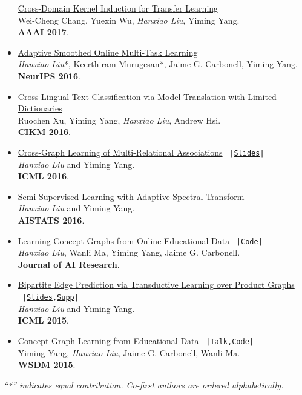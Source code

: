 \documentclass{article}
\begin{document}
\begin{itemize}
		\href{publications/chang-wu-aaai17.pdf}{Cross-Domain Kernel Induction for Transfer Learning} \\
		Wei-Cheng Chang, Yuexin Wu, \emph{Hanxiao Liu}, Yiming Yang. \\
		\textbf{AAAI 2017}.
	\item
		\href{publications/murugesan-liu-nips16.pdf}{Adaptive Smoothed Online Multi-Task Learning} \\
		\emph{Hanxiao Liu}*, Keerthiram Murugesan*, Jaime G. Carbonell, Yiming Yang. \\
		\textbf{NeurIPS 2016}.
	\item
		\href{publications/xu-cikm16.pdf}{Cross-Lingual Text Classification via Model Translation with Limited Dictionaries} \\
		Ruochen Xu, Yiming Yang, \emph{Hanxiao Liu}, Andrew Hsi. \\
		\textbf{CIKM 2016}. 
	\item 
		\href{publications/liu-icml16.pdf}{Cross-Graph Learning of Multi-Relational Associations}
		\
		\texttt{\scriptsize |\href{slides/icml2016-liu.pdf}{Slides}|} \\
		\emph{Hanxiao Liu} and Yiming Yang. \\
		\textbf{ICML 2016}.
	\item
		\href{publications/liu-aistats16.pdf}{Semi-Supervised Learning with Adaptive Spectral Transform} \\
		\emph{Hanxiao Liu} and Yiming Yang. \\
		\textbf{AISTATS 2016}.
	\item
		\href{publications/liu-jair16.pdf}{Learning Concept Graphs from Online Educational Data}
		\
		\texttt{\scriptsize |\href{https://github.com/quark0/CGL}{Code}|} \\
		\emph{Hanxiao Liu}, Wanli Ma, Yiming Yang, Jaime G. Carbonell. \\
		\textbf{Journal of AI Research}.
	\item 
		\href{publications/liu-icml15.pdf}{Bipartite Edge Prediction via Transductive Learning over Product Graphs}
		\
		\texttt{\scriptsize |\href{slides/icml2015-liu.pdf}{Slides},\href{publications/liu-icml15-supp.pdf}{Supp}|} \\
		\emph{Hanxiao Liu} and Yiming Yang. \\
		\textbf{ICML 2015}. \\
	\item
		\href{publications/yang-wsdm15.pdf}{Concept Graph Learning from Educational Data}
		\
		\texttt{\scriptsize |\href{slides/wsdm2015-liu.pdf}{Talk},\href{https://github.com/quark0/CGL}{Code}|} \\
		Yiming Yang, \emph{Hanxiao Liu}, Jaime G. Carbonell, Wanli Ma. \\
		\textbf{WSDM 2015}. \\
\end{itemize}
{\textit{``*'' indicates equal contribution. Co-first authors are ordered alphabetically.}}
\end{document}
